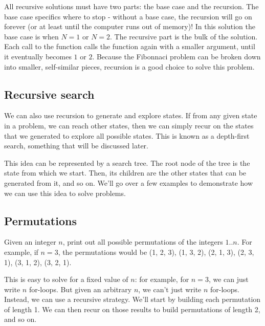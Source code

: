 All recursive solutions must have two parts: the base case and the recursion.  The base case specifics where to stop - without a base case, the recursion will go on forever (or at least until the computer runs out of memory)!  In this solution the base case is when $ N = 1 $ or $ N = 2 $.  The recursive part is the bulk of the solution.  Each call to the function calls the function again with a smaller argument, until it eventually becomes $ 1 $ or $ 2 $.  Because the Fibonnaci problem can be broken down into smaller, self-similar pieces, recursion is a good choice to solve this problem.


\subsection{Recursive search} \label{recursive-search} %
We can also use recursion to generate and explore states. If from any given state in a problem, we can reach other states, then we can simply recur on the states that we generated to explore all possible states. This is known as a depth-first search, something that will be discussed later.

This idea can be represented by a search tree. The root node of the tree is the state from which we start. Then, its children are the other states that can be generated from it, and so on. We'll go over a few examples to demonstrate how we can use this idea to solve problems.


\subsection{Permutations}

\begin{Problem}
Given an integer $n$, print out all possible permutations of the integers $1..n$. For example, if $n=3$, the permutations would be (1, 2, 3), (1, 3, 2), (2, 1, 3), (2, 3, 1), (3, 1, 2), (3, 2, 1).
\end{Problem}

\noindent This is easy to solve for a fixed value of $n$: for example, for $n=3$, we can just write $n$ for-loops. But given an arbitrary $n$, we can't just write $n$ for-loops. Instead, we can use a recursive strategy. We'll start by building each permutation of length 1. We can then recur on those results to build permutations of length 2, and so on.


